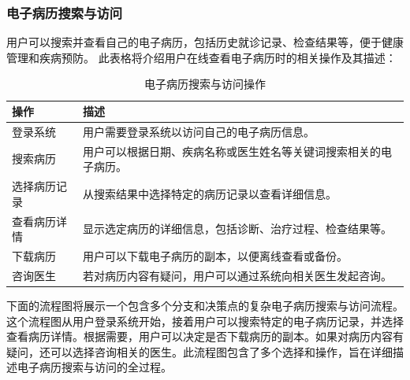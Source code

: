 \subsubsection{电子病历搜索与访问}
用户可以搜索并查看自己的电子病历，包括历史就诊记录、检查结果等，便于健康管理和疾病预防。
此表格将介绍用户在线查看电子病历时的相关操作及其描述：
\begin{table}[htbp]
	\centering
	\begin{tabular}{|p{6cm}|p{6cm}|}
		\hline
		\textbf{操作} & \textbf{描述} \\
		\hline
		登录系统 & 用户需要登录系统以访问自己的电子病历信息。 \\
		搜索病历 & 用户可以根据日期、疾病名称或医生姓名等关键词搜索相关的电子病历。 \\
		选择病历记录 & 从搜索结果中选择特定的病历记录以查看详细信息。 \\
		查看病历详情 & 显示选定病历的详细信息，包括诊断、治疗过程、检查结果等。 \\
		下载病历 & 用户可以下载电子病历的副本，以便离线查看或备份。 \\
		咨询医生 & 若对病历内容有疑问，用户可以通过系统向相关医生发起咨询。 \\
		\hline
	\end{tabular}
	\caption{电子病历搜索与访问操作}
\end{table}

下面的流程图将展示一个包含多个分支和决策点的复杂电子病历搜索与访问流程。这个流程图从用户登录系统开始，接着用户可以搜索特定的电子病历记录，并选择查看病历详情。根据需要，用户可以决定是否下载病历的副本。如果对病历内容有疑问，还可以选择咨询相关的医生。此流程图包含了多个选择和操作，旨在详细描述电子病历搜索与访问的全过程。

